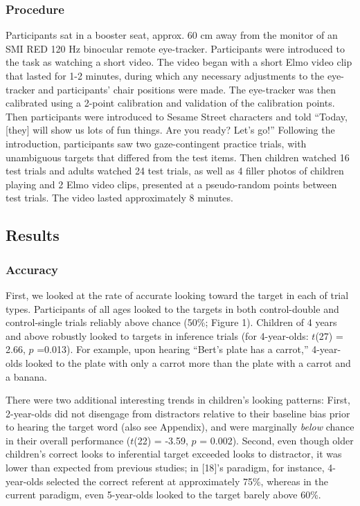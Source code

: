 \documentclass{rsos}
\begin{document}
\subsubsection{Procedure}\label{procedure}

Participants sat in a booster seat, approx. 60 cm away from the monitor
of an SMI RED 120 Hz binocular remote eye-tracker. Participants were
introduced to the task as watching a short video. The video began with a
short Elmo video clip that lasted for 1-2 minutes, during which any
necessary adjustments to the eye-tracker and participants' chair
positions were made. The eye-tracker was then calibrated using a 2-point
calibration and validation of the calibration points. Then participants
were introduced to Sesame Street characters and told ``Today, {[}they{]}
will show us lots of fun things. Are you ready? Let's go!'' Following
the introduction, participants saw two gaze-contingent practice trials,
with unambiguous targets that differed from the test items. Then
children watched 16 test trials and adults watched 24 test trials, as
well as 4 filler photos of children playing and 2 Elmo video clips,
presented at a pseudo-random points between test trials. The video
lasted approximately 8 minutes.

\subsection{Results}\label{results}

\subsubsection{Accuracy}\label{accuracy}

First, we looked at the rate of accurate looking toward the target in
each of trial types. Participants of all ages looked to the targets in
both control-double and control-single trials reliably above chance
(50\%; Figure 1). Children of 4 years and above robustly looked to
targets in inference trials (for 4-year-olds: \(t\)(27) = 2.66, \(p\)
=0.013). For example, upon hearing ``Bert's plate has a carrot,''
4-year-olds looked to the plate with only a carrot more than the plate
with a carrot and a banana.

There were two additional interesting trends in children's looking
patterns: First, 2-year-olds did not disengage from distractors relative
to their baseline bias prior to hearing the target word (also see
Appendix), and were marginally \emph{below} chance in their overall
performance (\(t\)(22) = -3.59, \(p\) = 0.002). Second, even though
older children's correct looks to inferential target exceeded looks to
distractor, it was lower than expected from previous studies; in
{[}18{]}'s paradigm, for instance, 4-year-olds selected the correct
referent at approximately 75\%, whereas in the current paradigm, even
5-year-olds looked to the target barely above 60\%.
\end{document}
